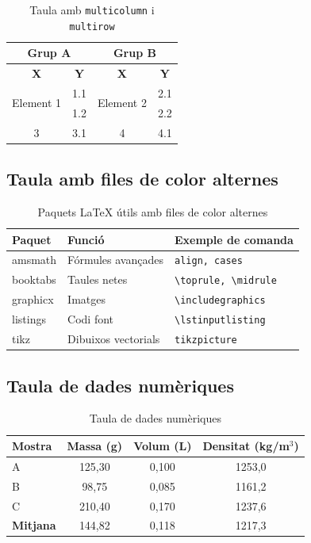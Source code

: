 \documentclass[informe, catalan]{practicaitic}
\theoremstyle{definition}
\theoremstyle{remark}
\begin{document}
\begin{table}[H]
\centering
\begin{tabular}{|c|c|c|c|}
  \hline
  \multicolumn{2}{|c|}{\textbf{Grup A}} & \multicolumn{2}{c|}{\textbf{Grup B}} \\
  \hline
  \textbf{X} & \textbf{Y} & \textbf{X} & \textbf{Y} \\
  \hline
  \multirow{2}{*}{Element 1} & 1.1 & \multirow{2}{*}{Element 2} & 2.1 \\
                              & 1.2 &                             & 2.2 \\
  \hline
  3 & 3.1 & 4 & 4.1 \\
  \hline
\end{tabular}
\caption{Taula amb \texttt{multicolumn} i \texttt{multirow}}
\label{tab:multi}
\end{table}

\subsection{Taula amb files de color alternes}

\begin{table}[H]
\centering
\begin{tabular}{lll}
  \toprule
  \textbf{Paquet} & \textbf{Funció} & \textbf{Exemple de comanda} \\
  \midrule
  \rowcolor{blue!8}  amsmath     & Fórmules avançades & \texttt{align, cases} \\
  booktabs    & Taules netes   & \texttt{\textbackslash toprule, \textbackslash midrule} \\
  \rowcolor{blue!8}  graphicx    & Imatges            & \texttt{\textbackslash includegraphics} \\
  listings    & Codi font      & \texttt{\textbackslash lstinputlisting} \\
  \rowcolor{blue!8}  tikz        & Dibuixos vectorials & \texttt{tikzpicture} \\
  \bottomrule
\end{tabular}
\caption{Paquets LaTeX útils amb files de color alternes}
\label{tab:paquets}
\end{table}

\subsection{Taula de dades numèriques}

\begin{table}[H]
\centering
\begin{tabular}{lccc}
  \toprule
  \textbf{Mostra} & \textbf{Massa (g)} & \textbf{Volum (L)} & \textbf{Densitat (kg/m$^3$)} \\
  \midrule
  A & 125,30 & 0,100 & 1253,0 \\
  B &  98,75 & 0,085 & 1161,2 \\
  C & 210,40 & 0,170 & 1237,6 \\
  \midrule
  \textbf{Mitjana} & 144,82 & 0,118 & 1217,3 \\
  \bottomrule
\end{tabular}
\caption{Taula de dades numèriques}
\label{tab:numerica}
\end{table}
\end{document}
